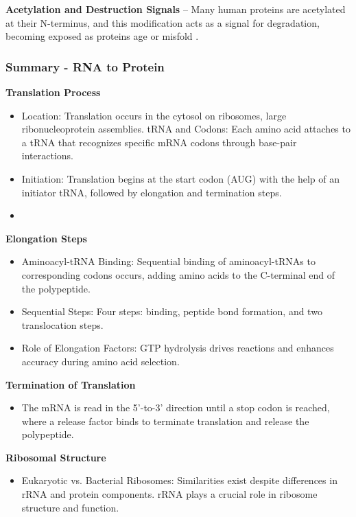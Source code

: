 \textbf{Acetylation and Destruction Signals} – Many human proteins are acetylated at their N-terminus, and this modification acts as a signal for degradation, becoming exposed as proteins age or misfold \cite*{L1-Chapter6}.

\subsubsection{Summary - RNA to Protein}
\textbf{Translation Process}
\begin{itemize}
    \item Location: Translation occurs in the cytosol on ribosomes, large ribonucleoprotein assemblies.
    tRNA and Codons: Each amino acid attaches to a tRNA that recognizes specific mRNA codons through base-pair interactions.
    \item Initiation: Translation begins at the start codon (AUG) with the help of an initiator tRNA, followed by elongation and termination steps.
    \item 
\end{itemize}

\textbf{Elongation Steps}
\begin{itemize}
    \item Aminoacyl-tRNA Binding: Sequential binding of aminoacyl-tRNAs to corresponding codons occurs, adding amino acids to the C-terminal end of the polypeptide.
    \item Sequential Steps: Four steps: binding, peptide bond formation, and two translocation steps.
    \item Role of Elongation Factors: GTP hydrolysis drives reactions and enhances accuracy during amino acid selection.
\end{itemize}

\textbf{Termination of Translation}
\begin{itemize}
    \item The mRNA is read in the 5'-to-3' direction until a stop codon is reached, where a release factor binds to terminate translation and release the polypeptide.
\end{itemize}

\textbf{Ribosomal Structure}
\begin{itemize}
    \item Eukaryotic vs. Bacterial Ribosomes: Similarities exist despite differences in rRNA and protein components. rRNA plays a crucial role in ribosome structure and function.
\end{itemize}
 
